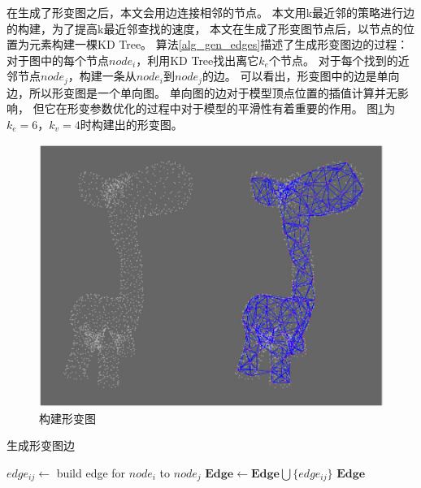 在生成了形变图之后，本文会用边连接相邻的节点。
本文用k最近邻的策略进行边的构建，为了提高k最近邻查找的速度，
本文在生成了形变图节点后，以节点的位置为元素构建一棵KD Tree。
算法\ref{alg_gen_edges}描述了生成形变图边的过程：
对于图中的每个节点$node_i$，利用KD Tree找出离它$k_e$个节点。
对于每个找到的近邻节点$node_j$，构建一条从$node_i$到$node_j$的边。
可以看出，形变图中的边是单向边，所以形变图是一个单向图。
单向图的边对于模型顶点位置的插值计算并无影响，
但它在形变参数优化的过程中对于模型的平滑性有着重要的作用。
图\ref{build_graph}为$k_e=6$，$k_v=4$时构建出的形变图。
\begin{figure}[]
    \centering
    \includegraphics[width = \textwidth]{./Pictures/build_graph.jpg}
    \caption{构建形变图}
    \label{build_graph}
\end{figure}
\begin{algorithm}
    \caption{生成形变图边}
    \label{alg_gen_edges}
    \begin{algorithmic}[1]
                    \State $edge_{ij} \gets$ build edge for $node_i$ to $node_j$
                    \State $\bm{Edge} \gets \bm{Edge} \bigcup \{edge_{ij}\}$
                \EndFor
            \EndFor
            \State \Return $\bm{Edge}$
        \EndFunction
    \end{algorithmic}
\end{algorithm} 

